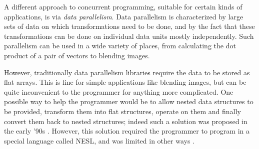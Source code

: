 \documentclass[a4paper]{acmtrans2m}
\begin{document}
A different approach to concurrent programming, suitable for certain kinds of
applications, is via \textit{data parallelism}. Data parallelism is
characterized by large sets of data on which transformations need to be done,
and by the fact that these transformations can be done on individual data
units mostly independently. Such parallelism can be used in a wide variety of
places, from calculating the dot product of a pair of vectors to blending
images.

However, traditionally data parallelism libraries require the data to be stored
as flat arrays. This is fine for simple applications like blending images, but
can be quite inconvenient to the programmer for anything more complicated. One
possible way to help the programmer would be to allow nested data structures to
be provided, transform them into flat structures, operate on them and finally
convert them back to nested structures; indeed such a solution was proposed in
the early '90s \cite{Blelloch:1993,Blelloch:1996}. However, this solution required
the programmer to program in a special language called NESL, and was limited in
other ways \cite{Chakravarty:2007}.



\end{document}

